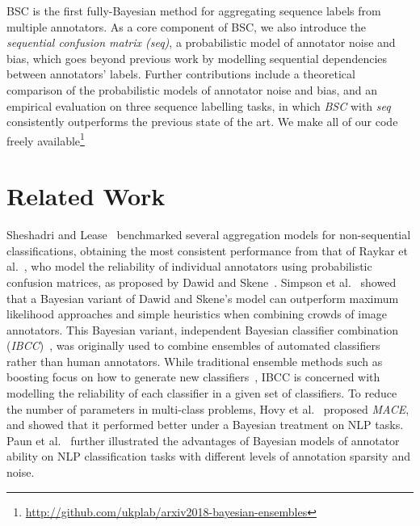 BSC is 
the first fully-Bayesian method for aggregating sequence labels from multiple annotators.
As a core component of BSC, we also introduce the \emph{sequential confusion matrix (seq)},
a probabilistic model of annotator noise and bias, 
which goes beyond previous work by modelling sequential dependencies between annotators' labels.
Further contributions include a theoretical comparison of the probabilistic models of annotator noise and bias,
and an empirical evaluation on three sequence labelling tasks,
in which \emph{BSC} with \emph{seq} consistently outperforms the previous state of the art. 
We make 
all of our code freely available\footnote{\url{http://github.com/ukplab/arxiv2018-bayesian-ensembles}}

\section{Related Work}

Sheshadri and Lease~ benchmarked several 
aggregation models for non-sequential classifications, 
obtaining the most consistent performance from 
that of Raykar et al.~, who
model the reliability of individual annotators
using probabilistic confusion matrices,
as proposed by Dawid and Skene~.
Simpson et al.~ showed that a Bayesian variant of
Dawid and Skene's model
can outperform maximum likelihood approaches and simple heuristics
when combining crowds of image annotators.
This Bayesian variant, independent Bayesian classifier combination
(\emph{IBCC})~\cite{kim2012bayesian}, 
was originally used to combine ensembles of automated classifiers
rather than human annotators. While
traditional ensemble methods such as boosting focus on how to generate
new classifiers~\cite{dietterich2000ensemble},
IBCC is concerned with modelling the reliability of each classifier in a given
set of classifiers.
To reduce the number of parameters in multi-class problems,
Hovy et al.~ proposed \emph{MACE}, 
and showed that it performed better under a Bayesian treatment on NLP tasks.
Paun et al.~ further illustrated
the advantages of Bayesian models of annotator ability on NLP classification tasks
with different levels of annotation sparsity and noise.

